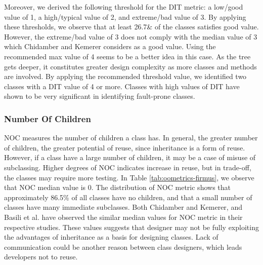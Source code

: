 Moreover, we derived the following threshold for the DIT metric: a low/good value of 1, a high/typical value of 2, and extreme/bad value of 3. By applying these thresholds, we observe that at least 26.7\& of the classes satisfies good value. However, the extreme/bad value of 3 does not comply with the median value of 3 which Chidamber and Kemerer\cite{chidamber1994metrics} considers as a good value. Using the recommended max value of 4 seems to be a better idea in this case. As the tree gets deeper, it constitutes greater design complexity as more classes and methods are involved. By applying the recommended threshold value, we identified two classes with a DIT value of 4 or more. Classes with high values of DIT have shown to be very significant in identifying fault-prone classes\cite{basili1996validation}.



\subsubsection{Number Of Children}
NOC measures the number of children a class has. In general, the greater number of children, the greater potential of reuse, since inheritance is a form of reuse. However, if a class have a large number of children, it may be a case of misuse of subclassing\cite{basili1996validation}. Higher degrees of NOC indicates increase in reuse, but in trade-off, the classes may require more testing. In Table \ref{tab:oometrics-firmus}, we observe that NOC median value is 0. The distribution of NOC metric shows that approximately 86.5\% of all classes have no children, and that a small number of classes have many immediate subclasses. Both Chidamber and Kemerer\cite{chidamber1994metrics}, and Basili et al.\cite{basili1996validation} have observed the similar median values for NOC metric in their respective studies. These values suggests that designer may not be fully exploiting the advantages of inheritance as a basis for designing classes. Lack of communication could be another reason between class designers, which leads developers not to reuse.

